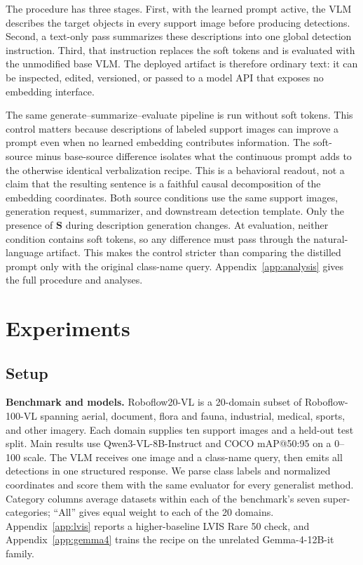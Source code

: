 \documentclass{article}
\newcommand{\qwen}{Qwen3-VL}
\newcommand{\rftwenty}{Roboflow20-VL}
\begin{document}
The procedure has three stages. First, with the learned prompt active, the VLM
describes the target objects in every support image before producing
detections. Second, a text-only pass summarizes these descriptions into one
global detection instruction. Third, that instruction replaces the soft
tokens and is evaluated with the unmodified base VLM. The deployed artifact is
therefore ordinary text: it can be inspected, edited, versioned, or passed to a
model API that exposes no embedding interface.

The same generate--summarize--evaluate pipeline is run without soft tokens.
This control matters because descriptions of labeled support images can improve
a prompt even when no learned embedding contributes information. The
soft-source minus base-source difference isolates what the continuous prompt
adds to the otherwise identical verbalization recipe. This is a behavioral
readout, not a claim that the resulting sentence is a faithful causal
decomposition of the embedding coordinates.
Both source conditions use the same support images, generation request,
summarizer, and downstream detection template. Only the presence of
$\mathbf S$ during description generation changes. At evaluation, neither
condition contains soft tokens, so any difference must pass through the
natural-language artifact. This makes the control stricter than comparing the
distilled prompt only with the original class-name query.
Appendix~\ref{app:analysis} gives the full procedure and analyses.

\section{Experiments}
\label{sec:experiments}

\subsection{Setup}
\label{subsec:setup}

\textbf{Benchmark and models.}
\rftwenty{} is a 20-domain subset of Roboflow-100-VL
\citep{Robicheaux2025Roboflow100-VL:Models} spanning aerial, document, flora
and fauna, industrial, medical, sports, and other imagery.
Each domain supplies ten support images and a held-out test split.
Main results use \qwen{}-8B-Instruct and COCO mAP@50:95 on a 0--100 scale.
The VLM receives one image and a class-name query, then emits all detections in
one structured response. We parse class labels and normalized coordinates and
score them with the same evaluator for every generalist method. Category
columns average datasets within each of the benchmark's seven
super-categories; ``All'' gives equal weight to each of the 20 domains.
Appendix~\ref{app:lvis} reports a higher-baseline LVIS Rare 50 check, and
Appendix~\ref{app:gemma4} trains the recipe on the unrelated
Gemma-4-12B-it family.
\end{document}
